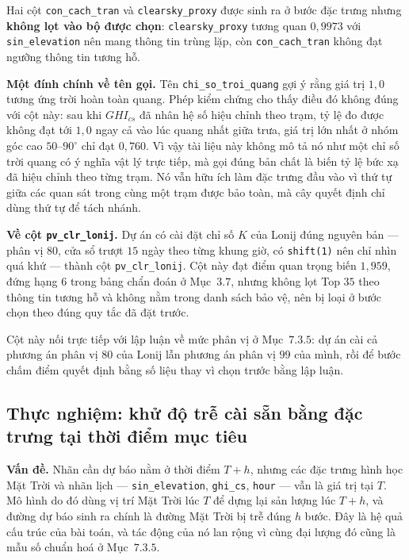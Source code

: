 \documentclass[12pt, a4paper]{report}
\begin{document}
Hai cột \texttt{con\_cach\_tran} và \texttt{clearsky\_proxy} được sinh ra ở bước đặc trưng nhưng
\textbf{không lọt vào bộ được chọn}: \texttt{clearsky\_proxy} tương quan $0{,}9973$ với
\texttt{sin\_elevation} nên mang thông tin trùng lặp, còn \texttt{con\_cach\_tran} không đạt ngưỡng
thông tin tương hỗ.

\textbf{Một đính chính về tên gọi.} Tên \texttt{chi\_so\_troi\_quang} gợi ý rằng giá trị $1{,}0$
tương ứng trời hoàn toàn quang. Phép kiểm chứng cho thấy điều đó không đúng với cột này: sau
khi $GHI_{cs}$ đã nhân hệ số hiệu chỉnh theo trạm, tỷ lệ đo được không đạt tới $1{,}0$
ngay cả vào lúc quang nhất giữa trưa, giá trị lớn nhất ở nhóm góc cao $50$--$90^\circ$ chỉ
đạt $0{,}760$. Vì vậy tài liệu này không mô tả nó như một chỉ số trời quang có ý nghĩa vật lý
trực tiếp, mà gọi đúng bản chất là biến tỷ lệ bức xạ đã hiệu chỉnh theo từng trạm. Nó
vẫn hữu ích làm đặc trưng đầu vào vì thứ tự giữa các quan sát trong cùng một trạm được bảo
toàn, mà cây quyết định chỉ dùng thứ tự để tách nhánh.

\textbf{Về cột \texttt{pv\_clr\_lonij}.} Dự án có cài đặt chỉ số $K$ của Lonij đúng nguyên bản ---
phân vị $80$, cửa sổ trượt $15$ ngày theo từng khung giờ, có \texttt{shift(1)} nên chỉ nhìn quá
khứ --- thành cột \texttt{pv\_clr\_lonij}. Cột này đạt điểm quan trọng biến $1{,}959$, đứng hạng $6$
trong bảng chẩn đoán ở Mục~$3.7$, nhưng không lọt Top $35$ theo thông tin tương hỗ và không nằm
trong danh sách bảo vệ, nên bị loại ở bước chọn theo đúng quy tắc đã đặt trước.

Cột này nối trực tiếp với lập luận về mức phân vị ở Mục~$7.3.5$: dự án cài cả phương án phân vị
$80$ của Lonij lẫn phương án phân vị $99$ của mình, rồi để bước chấm điểm quyết định bằng số
liệu thay vì chọn trước bằng lập luận.

\FloatBarrier
\subsection{Thực nghiệm: khử độ trễ cài sẵn bằng đặc trưng tại thời điểm mục tiêu}

\textbf{Vấn đề.} Nhãn cần dự báo nằm ở thời điểm $T{+}h$, nhưng các đặc trưng hình học Mặt Trời
và nhãn lịch --- \texttt{sin\_elevation}, \texttt{ghi\_cs}, \texttt{hour} --- vẫn là giá trị tại $T$. Mô
hình do đó dùng vị trí Mặt Trời lúc $T$ để dựng lại sản lượng lúc $T{+}h$, và đường dự báo sinh
ra chính là đường Mặt Trời bị trễ đúng $h$ bước. Đây là hệ quả cấu trúc của bài toán, và tác
động của nó lan rộng vì cùng đại lượng đó cũng là mẫu số chuẩn hoá ở Mục~$7.3.5$.
\end{document}
